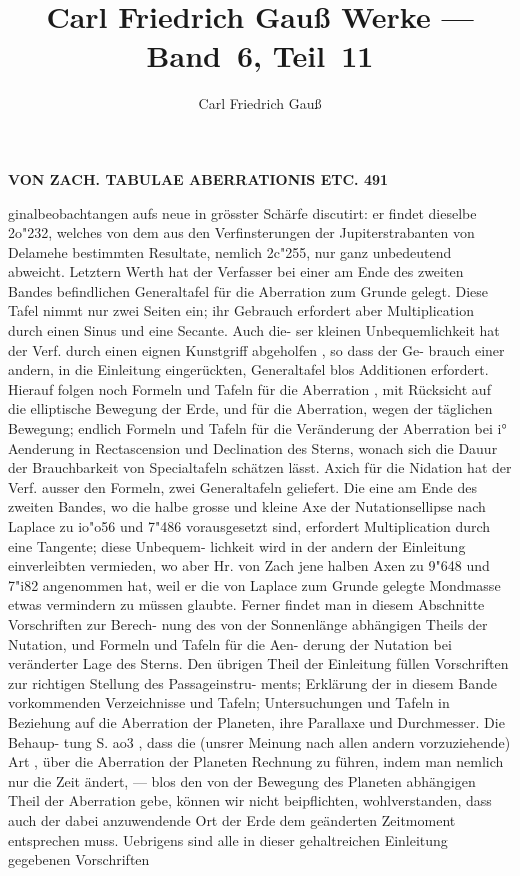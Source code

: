 \documentclass[12pt,a4paper]{article}
\title{Carl Friedrich Gauß Werke --- Band~6, Teil~11}
\author{Carl Friedrich Gauß}
\date{}
\begin{document}
\maketitle
\thispagestyle{fancy}


\noindent\textbf{VON  ZACH.  TABULAE  ABERRATIONIS  ETC.  491}

ginalbeobachtangen  aufs  neue  in  grösster  Schärfe  discutirt:  er  findet  dieselbe  2o"232,  welches  von  dem aus  den  Verfinsterungen  der  Jupiterstrabanten  von  Delamehe  bestimmten  Resultate,  nemlich  2c"255, nur  ganz  unbedeutend  abweicht.  Letztern  Werth  hat  der  Verfasser  bei  einer  am  Ende  des  zweiten Bandes  befindlichen  Generaltafel  für  die  Aberration  zum  Grunde  gelegt.  Diese  Tafel  nimmt  nur  zwei Seiten  ein;  ihr  Gebrauch  erfordert  aber  Multiplication  durch  einen  Sinus  und  eine  Secante.  Auch  die- ser kleinen  Unbequemlichkeit  hat  der  Verf.  durch  einen  eignen  Kunstgriff  abgeholfen ,  so  dass  der  Ge- brauch einer  andern,  in  die  Einleitung  eingerückten,  Generaltafel  blos  Additionen  erfordert.  Hierauf folgen  noch  Formeln  und  Tafeln  für  die  Aberration ,  mit  Rücksicht  auf  die  elliptische  Bewegung  der Erde,  und  für  die  Aberration,  wegen  der  täglichen  Bewegung;  endlich  Formeln  und  Tafeln  für  die Veränderung  der  Aberration  bei  i°  Aenderung  in  Rectascension  und  Declination  des  Sterns,  wonach sich  die  Dauur  der  Brauchbarkeit  von  Specialtafeln  schätzen  lässt. Axich  für  die  Nidation  hat  der  Verf.  ausser  den  Formeln,  zwei  Generaltafeln  geliefert.  Die  eine am  Ende  des  zweiten  Bandes,  wo  die  halbe  grosse  und  kleine  Axe  der  Nutationsellipse  nach  Laplace zu  io"o56  und  7"486  vorausgesetzt  sind,  erfordert  Multiplication  durch  eine  Tangente;  diese  Unbequem- lichkeit wird  in  der  andern  der  Einleitung  einverleibten  vermieden,  wo  aber  Hr.  von  Zach  jene  halben Axen  zu  9"648  und  7"i82  angenommen  hat,  weil  er  die  von  Laplace  zum  Grunde  gelegte  Mondmasse etwas  vermindern  zu  müssen  glaubte.  Ferner  findet  man  in  diesem  Abschnitte  Vorschriften  zur  Berech- nung des  von  der  Sonnenlänge  abhängigen  Theils  der  Nutation,  und  Formeln  und  Tafeln  für  die  Aen- derung der  Nutation  bei  veränderter  Lage  des  Sterns. Den  übrigen  Theil  der  Einleitung  füllen  Vorschriften  zur  richtigen  Stellung  des  Passageinstru- ments; Erklärung  der  in  diesem  Bande  vorkommenden  Verzeichnisse  und  Tafeln;  Untersuchungen  und Tafeln  in  Beziehung  auf  die  Aberration  der  Planeten,  ihre  Parallaxe  und  Durchmesser.  Die  Behaup- tung S.  ao3 ,  dass  die  (unsrer  Meinung  nach  allen  andern  vorzuziehende)  Art ,  über  die  Aberration  der Planeten  Rechnung  zu  führen,  indem  man  nemlich  nur  die  Zeit  ändert,  ---  blos  den  von  der  Bewegung des  Planeten  abhängigen  Theil  der  Aberration  gebe,  können  wir  nicht  beipflichten,  wohlverstanden, dass  auch  der  dabei  anzuwendende  Ort  der  Erde  dem  geänderten  Zeitmoment  entsprechen  muss. Uebrigens  sind  alle  in  dieser  gehaltreichen  Einleitung  gegebenen  Vorschriften  
\end{document}
